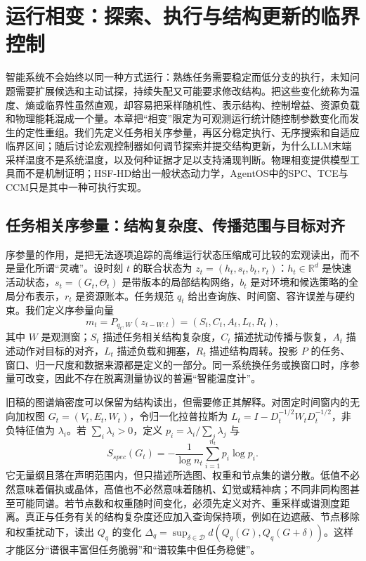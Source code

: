 \chapter{运行相变：探索、执行与结构更新的临界控制}
\label{chp:phase_transition_meta}

智能系统不会始终以同一种方式运行：熟练任务需要稳定而低分支的执行，未知问题需要扩展候选和主动试探，持续失配又可能要求修改结构。把这些变化统称为温度、熵或临界性虽然直观，却容易把采样随机性、表示结构、控制增益、资源负载和物理能耗混成一个量。本章把“相变”限定为可观测运行统计随控制参数变化而发生的定性重组。我们先定义任务相关序参量，再区分稳定执行、无序搜索和自适应临界区间；随后讨论宏观控制器如何调节探索并提交结构更新，为什么LLM末端采样温度不是系统温度，以及何种证据才足以支持涌现判断。物理相变提供模型工具而不是机制证明；HSF-HD给出一般状态动力学，AgentOS中的SPC、TCE与CCM只是其中一种可执行实现。

\section{任务相关序参量：结构复杂度、传播范围与目标对齐}
\label{sec:section_6298}

序参量的作用，是把无法逐项追踪的高维运行状态压缩成可比较的宏观读出，而不是量化所谓“灵魂”。设时刻 $t$ 的联合状态为 $z_t=(h_t,s_t,b_t,r_t)$：$h_t\in\mathbb R^d$ 是快速活动状态，$s_t=(G_t,\Theta_t)$ 是带版本的局部结构网络，$b_t$ 是对环境和候选策略的全局分布表示，$r_t$ 是资源账本。任务规范 $q_t$ 给出查询族、时间窗、容许误差与硬约束。我们定义序参量向量
\[
 m_t=P_{q_t,W}(z_{t-W:t})=(S_t,C_t,A_t,L_t,R_t),
\]
其中 $W$ 是观测窗；$S_t$ 描述任务相关结构复杂度，$C_t$ 描述扰动传播与恢复，$A_t$ 描述动作对目标的对齐，$L_t$ 描述负载和拥塞，$R_t$ 描述结构周转。投影 $P$ 的任务、窗口、归一尺度和数据来源都是定义的一部分。同一系统换任务或换窗口时，序参量可改变，因此不存在脱离测量协议的普遍“智能温度计”。

旧稿的图谱熵密度可以保留为结构读出，但需要修正其解释。对固定时间窗内的无向加权图 $G_t=(V_t,E_t,W_t)$，令归一化拉普拉斯为 $L_t=I-D_t^{-1/2}W_tD_t^{-1/2}$，非负特征值为 $\lambda_i$。若 $\sum_i\lambda_i>0$，定义 $p_i=\lambda_i/\sum_j\lambda_j$ 与
\[
 S_{spec}(G_t)=-\frac{1}{\log n_t}\sum_{i=1}^{n_t}p_i\log p_i.
\]
它无量纲且落在声明范围内，但只描述所选图、权重和节点集的谱分散。低值不必然意味着偏执或晶体，高值也不必然意味着随机、幻觉或精神病；不同非同构图甚至可能同谱。若节点数和权重随时间变化，必须先定义对齐、重采样或谱测度距离。真正与任务有关的结构复杂度还应加入查询保持项，例如在边遮蔽、节点移除和权重扰动下，读出 $Q_q$ 的变化 $\Delta_q=\sup_{\delta\in\mathcal D}d(Q_q(G),Q_q(G+\delta))$。这样才能区分“谱很丰富但任务脆弱”和“谱较集中但任务稳健”。


